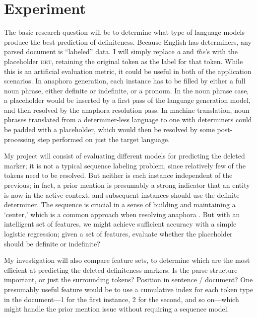 \documentclass[11pt]{article}
\begin{document}
\section{Experiment}
The basic research question will be to determine what type of language models produce the best prediction of definiteness. Because English has determiners, any parsed document is ``labeled'' data. I will simply replace \emph{a} and \emph{the}'s with the placeholder \guillemotleft\textsc{det}\guillemotright, retaining the original token as the label for that token. While this is an artificial evaluation metric, it could be useful in both of the application scenarios. In anaphora generation, each instance has to be filled by either a full noun phrase, either definite or indefinite, or a pronoun. In the noun phrase case, a placeholder would be inserted by a first pass of the language generation model, and then resolved by the anaphora resolution pass. In machine translation, noun phrases translated from a determiner-less language to one with determiners could be padded with a placeholder, which would then be resolved by some post-processing step performed on just the target language.

My project will consist of evaluating different models for predicting the deleted marker; it is not a typical sequence labeling problem, since relatively few of the tokens need to be resolved. But neither is each instance independent of the previous; in fact, a prior mention is presumably a strong indicator that an entity is now in the active context, and subsequent instances should use the definite determiner. The sequence is crucial in a sense of building and maintaining a `center,' which is a common approach when resolving anaphora \citep{grosz:1995, beaver:2000}.
But with an intelligent set of features, we might achieve sufficient accuracy with a simple logistic regression; given a set of features, evaluate whether the placeholder should be definite or indefinite?

My investigation will also compare feature sets, to determine which are the most efficient at predicting the deleted definiteness markers. Is the parse structure important, or just the surrounding tokens? Position in sentence / document? One presumably useful feature would be to use a cumulative index for each token type in the document---1 for the first instance, 2 for the second, and so on---which might handle the prior mention issue without requiring a sequence model.



\end{document}
